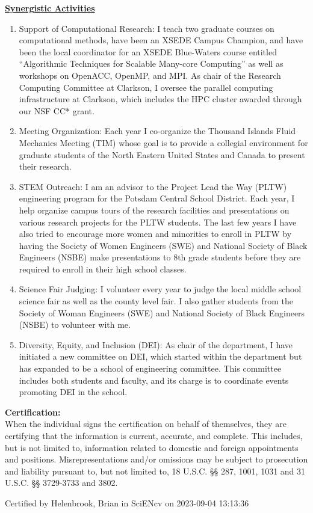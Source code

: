 \documentclass[11pt]{article}
\begin{document}
\noindent
{\bf \underline{Synergistic Activities}}
\vspace{-0.4\baselineskip}
\begin{enumerate}
\item Support of Computational Research: I teach two graduate courses on computational methods, have been an XSEDE Campus Champion, and have been the local coordinator for an XSEDE Blue-Waters course entitled “Algorithmic Techniques for Scalable Many-core Computing” as well as workshops on OpenACC, OpenMP, and MPI. As chair of the Research Computing Committee at Clarkson, I oversee the parallel computing infrastructure at Clarkson, which includes the HPC cluster awarded through our NSF CC* grant.
\item Meeting Organization: Each year I co-organize the Thousand Islands Fluid Mechanics Meeting (TIM) whose goal is to provide a collegial environment for graduate students of the North
Eastern United States and Canada to present their research.
\item STEM Outreach: I am an advisor to the Project Lead the Way (PLTW) engineering program for the Potsdam Central School District. Each year, I help organize campus tours of the research facilities and presentations on various research projects for the PLTW students. The last few
years I have also tried to encourage more women and minorities to enroll in PLTW by having
the Society of Women Engineers (SWE) and National Society of Black Engineers (NSBE) make
presentations to 8th grade students before they are required to enroll in their high school classes.
\item Science Fair Judging: I volunteer every year to judge the local middle school science fair as well
as the county level fair. I also gather students from the Society of Woman Engineers (SWE) and National Society of Black Engineers (NSBE) to volunteer with me.
\item Diversity, Equity, and Inclusion (DEI): As chair of the department, I have initiated a new
committee on DEI, which started within the department but has expanded to be a school of
engineering committee. This committee includes both students and faculty, and its charge is to
coordinate events promoting DEI in the school.
\end{enumerate}

\noindent
{\bf Certification:}\\
When the individual signs the certification on behalf of themselves, they are certifying that the information is current, accurate, and complete. This includes, but is not limited to, information related to domestic and foreign appointments and positions. Misrepresentations and/or omissions may be subject to prosecution and liability pursuant to, but not limited to, 18 U.S.C. §§ 287, 1001, 1031 and 31 U.S.C. §§ 3729-3733 and 3802.

\vspace{\baselineskip}
\noindent
Certified by Helenbrook, Brian in SciENcv on 2023-09-04 13:13:36
\end{document}
